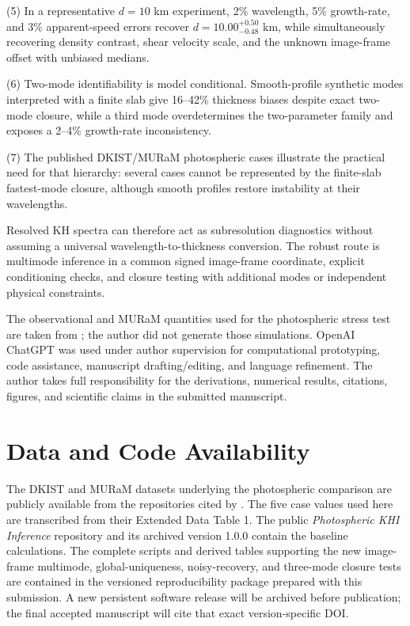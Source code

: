 \documentclass[linenumbers]{aastex7}
\begin{document}
(5) In a representative $d=10$ km experiment, 2\% wavelength, 5\% growth-rate, and 3\% apparent-speed errors recover $d=10.00^{+0.50}_{-0.48}$ km, while simultaneously recovering density contrast, shear velocity scale, and the unknown image-frame offset with unbiased medians.

(6) Two-mode identifiability is model conditional. Smooth-profile synthetic modes interpreted with a finite slab give 16--42\% thickness biases despite exact two-mode closure, while a third mode overdetermines the two-parameter family and exposes a 2--4\% growth-rate inconsistency.

(7) The published DKIST/MURaM photospheric cases illustrate the practical need for that hierarchy: several cases cannot be represented by the finite-slab fastest-mode closure, although smooth profiles restore instability at their wavelengths.

Resolved KH spectra can therefore act as subresolution diagnostics without assuming a universal wavelength-to-thickness conversion. The robust route is multimode inference in a common signed image-frame coordinate, explicit conditioning checks, and closure testing with additional modes or independent physical constraints.

\begin{acknowledgments}
The observational and MURaM quantities used for the photospheric stress test are taken from \citet{Kuridze2026}; the author did not generate those simulations. OpenAI ChatGPT \citep{OpenAI2026} was used under author supervision for computational prototyping, code assistance, manuscript drafting/editing, and language refinement. The author takes full responsibility for the derivations, numerical results, citations, figures, and scientific claims in the submitted manuscript.
\end{acknowledgments}


\section*{Data and Code Availability}
The DKIST and MURaM datasets underlying the photospheric comparison are publicly available from the repositories cited by \citet{Kuridze2026}. The five case values used here are transcribed from their Extended Data Table 1. The public \emph{Photospheric KHI Inference} repository and its archived version 1.0.0 \citep{Zhang2026Software} contain the baseline calculations. The complete scripts and derived tables supporting the new image-frame multimode, global-uniqueness, noisy-recovery, and three-mode closure tests are contained in the versioned reproducibility package prepared with this submission. A new persistent software release will be archived before publication; the final accepted manuscript will cite that exact version-specific DOI.



\end{document}

